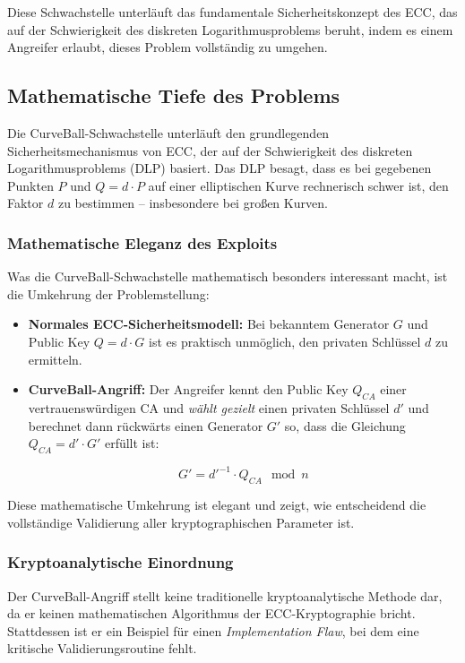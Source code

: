 \documentclass{article}
\begin{document}
Diese Schwachstelle unterläuft das fundamentale Sicherheitskonzept des ECC, das auf der Schwierigkeit des diskreten Logarithmusproblems beruht, indem es einem Angreifer erlaubt, dieses Problem vollständig zu umgehen.

\subsection{Mathematische Tiefe des Problems}

Die CurveBall-Schwachstelle unterläuft den grundlegenden Sicherheitsmechanismus von ECC, der auf der Schwierigkeit des diskreten Logarithmusproblems (DLP) basiert. Das DLP besagt, dass es bei gegebenen Punkten \(P\) und \(Q = d \cdot P\) auf einer elliptischen Kurve rechnerisch schwer ist, den Faktor \(d\) zu bestimmen – insbesondere bei großen Kurven.

\subsubsection{Mathematische Eleganz des Exploits}
Was die CurveBall-Schwachstelle mathematisch besonders interessant macht, ist die Umkehrung der Problemstellung:

\begin{itemize}
  \item \textbf{Normales ECC-Sicherheitsmodell:} Bei bekanntem Generator \(G\) und Public Key \(Q = d \cdot G\) ist es praktisch unmöglich, den privaten Schlüssel \(d\) zu ermitteln.
  
  \item \textbf{CurveBall-Angriff:} Der Angreifer kennt den Public Key \(Q_{CA}\) einer vertrauenswürdigen CA und \textit{wählt gezielt} einen privaten Schlüssel \(d'\) und berechnet dann rückwärts einen Generator \(G'\) so, dass die Gleichung \(Q_{CA} = d' \cdot G'\) erfüllt ist:
  
  \begin{equation}
  G' = {d'}^{-1} \cdot Q_{CA} \mod n
  \end{equation}
\end{itemize}

Diese mathematische Umkehrung ist elegant und zeigt, wie entscheidend die vollständige Validierung aller kryptographischen Parameter ist.

\subsubsection{Kryptoanalytische Einordnung}
Der CurveBall-Angriff stellt keine traditionelle kryptoanalytische Methode dar, da er keinen mathematischen Algorithmus der ECC-Kryptographie bricht. Stattdessen ist er ein Beispiel für einen \textit{Implementation Flaw}, bei dem eine kritische Validierungsroutine fehlt.
\end{document}
